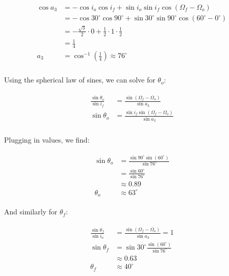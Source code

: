 \documentclass[
]{article}
\begin{document}
\[\begin{aligned}
\begin{aligned}
    \cos a_3 &= - \cos i_o \cos i_f + \sin i_o \sin i_f \cos(\Omega_f - \Omega_o) \\
    &= - \cos 30^\circ \cos 90^\circ + \sin 30^\circ \sin 90^\circ \cos(60^\circ - 0^\circ) \\
    &= - \frac{\sqrt{3}}{2} \cdot 0 + \frac{1}{2} \cdot 1 \cdot \frac{1}{2} \\
    &= \frac{1}{4} \\
    a_3 &= \cos^{-1} \left( \frac{1}{4} \right) \approx 76^\circ \\
\end{aligned}
\end{aligned}\]

Using the spherical law of sines, we can solve for \(\theta_o\):

\[\begin{aligned}
\begin{aligned}
    \frac{\sin\theta_o}{\sin i_f} &= \frac{\sin(\Omega_f - \Omega_o)}{\sin a_3} \\
    \sin\theta_o &= \frac{\sin i_f \sin(\Omega_f - \Omega_o)}{\sin a_3} \\
\end{aligned}
\end{aligned}\]

Plugging in values, we find:

\[\begin{aligned}
\begin{aligned}
    \sin\theta_o &= \frac{\sin 90^\circ \sin(60^\circ)}{\sin 76^\circ} \\
    &= \frac{\sin 60^\circ}{\sin 76^\circ} \\
    &\approx 0.89 \\
    \theta_o &\approx 63^\circ
\end{aligned}
\end{aligned}\]

And similarly for \(\theta_f\):

\[\begin{aligned}
\begin{aligned}
    \frac{\sin\theta_f}{\sin i_o} &= \frac{\sin(\Omega_f - \Omega_o)}{\sin a_3} = 1 \\
    \sin\theta_f &= \sin 30^\circ \frac{\sin(60^\circ)}{\sin 76^\circ} \\
    &\approx 0.63 \\
    \theta_f &\approx 40^\circ
\end{aligned}
\end{aligned}\]
\end{document}
